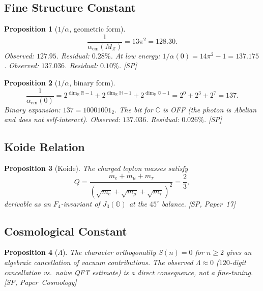 \documentclass[11pt, a4paper]{article}
\newtheorem{proposition}{Proposition}
\newcommand{\R}{\mathbb{R}}
\newcommand{\C}{\mathbb{C}}
\newcommand{\Hq}{\mathbb{H}}
\newcommand{\Oct}{\mathbb{O}}
\begin{document}
\subsection{Fine Structure Constant}

\begin{proposition}[$1/\alpha$, geometric form]
\begin{equation}
\frac{1}{\alpha_{\mathrm{em}}(M_Z)} = 13\pi^2 = 128.30.
\end{equation}
Observed: $127.95$. Residual: $0.28\%$.
At low energy: $1/\alpha(0) = 14\pi^2 - 1 = 137.175$. Observed: $137.036$.
Residual: $0.10\%$. [SP]
\end{proposition}

\begin{proposition}[$1/\alpha$, binary form]
\begin{equation}
\frac{1}{\alpha_{\mathrm{em}}(0)} = 2^{\dim_\R \R - 1} + 2^{\dim_\R \Hq - 1} + 2^{\dim_\R \Oct - 1}
= 2^0 + 2^3 + 2^7 = 137.
\end{equation}
Binary expansion: $137 = 10001001_2$. The bit for $\C$ is OFF
(the photon is Abelian and does not self-interact). Observed: $137.036$.
Residual: $0.026\%$. [SP]
\end{proposition}

\subsection{Koide Relation}

\begin{proposition}[Koide]
The charged lepton masses satisfy
\begin{equation}
Q = \frac{m_e + m_\mu + m_\tau}{(\sqrt{m_e} + \sqrt{m_\mu} + \sqrt{m_\tau})^2} = \frac{2}{3},
\end{equation}
derivable as an $F_4$-invariant of $J_3(\Oct)$ at the $45^\circ$ balance.
[SP, Paper~17]
\end{proposition}

\subsection{Cosmological Constant}

\begin{proposition}[$\Lambda$]
The character orthogonality $S(n) = 0$ for $n \geq 2$ gives an
algebraic cancellation of vacuum contributions. The observed
$\Lambda \approx 0$ ($120$-digit cancellation vs.\ naive QFT estimate)
is a direct consequence, not a fine-tuning. [SP, Paper~Cosmology]
\end{proposition}
\end{document}
